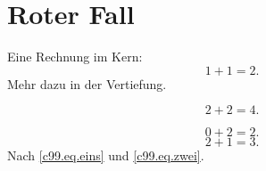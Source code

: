 \chapter{Roter Fall}\label{c99}

Eine Rechnung im Kern:
\begin{equation}\label{c99.eq.eins}
  1 + 1 = 2.
\end{equation}
Mehr dazu in der Vertiefung.

\begin{vertiefung}[id=c99.v1, titel={Tiefer}, wozu={Zeigt eine zweite Rechnung.},
    voraussetzung={Gleichung~\eqref{c99.eq.eins}.}, zurueck={Es bleibt bei zwei.}]
  \begin{equation}\label{c99.eq.tief}
    2 + 2 = 4.
  \end{equation}
\end{vertiefung}

\begin{equation}\label{c99.eq.eins}
  0 + 2 = 2.
\end{equation}
\begin{equation}\label{c99.eq.zwei}
  2 + 1 = 3.
\end{equation}
Nach \eqref{c99.eq.eins} und \eqref{c99.eq.zwei}.
